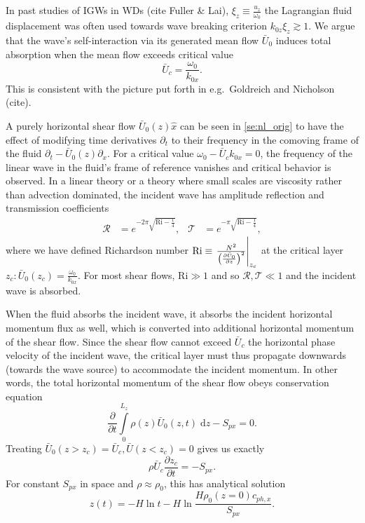 \documentclass[twocolumn,
        nofootinbib, %
        usenames, %
        aps,
        prd,
        dvipsnames %
    ]{revtex4-1}%
\newcommand*{\pd}[2]{\frac{\partial#1}{\partial#2}}
\newcommand*{\at}[1]{\left.#1\right|}
\DeclarePairedDelimiter\p{\lparen}{\rparen}
\begin{document}
In past studies of IGWs in WDs (cite Fuller \& Lai), $\xi_z \equiv
\frac{u_z}{\omega_0}$ the Lagrangian fluid displacement was often used towards
wave breaking criterion $k_{0z}\xi_z \gtrsim 1$. We argue that the wave's
self-interaction via its generated mean flow $\bar{U}_0$ induces total
absorption when the mean flow exceeds critical value
\begin{equation}
    \bar{U}_c = \frac{\omega_0}{k_{0x}}.
\end{equation}
This is consistent with the picture put forth in e.g.\ Goldreich and Nicholson
(cite).

A purely horizontal shear flow $\bar{U}_0(z) \hat{x}$ can be seen in
\autoref{se:nl_orig} to have the effect of modifying time derivatives
$\partial_t$ to their frequency in the comoving frame of the fluid $\partial_t -
\bar{U}_0(z)\partial_x$. For a critical value $\omega_0 - \bar{U}_c k_{0x} = 0$,
the frequency of the linear wave in the fluid's frame of reference vanishes and
critical behavior is observed. In a linear theory or a theory where small scales
are viscosity rather than advection dominated, the incident wave has amplitude
reflection and transmission coefficients
\begin{align}
    \mathcal{R} &= e^{-2\pi \sqrt{\mathrm{Ri} - \frac{1}{4}}}, &
    \mathcal{T} &= e^{-\pi \sqrt{\mathrm{Ri} - \frac{1}{4}}},
    \label{eq:crit_coeffs}
\end{align}
where we have defined Richardson number $\mathrm{Ri} \equiv
\at{\frac{N^2}{\p*{\pd{\bar{U}_0}{z}}^2}}_{z_c}$ at the critical layer $z_c:
\bar{U}_0(z_c) = \frac{\omega_0}{k_{0x}}$. For most shear flows, $\mathrm{Ri}
\gg 1$ and so $\mathcal{R}, \mathcal{T} \ll 1$ and the incident wave is
absorbed.

When the fluid absorbs the incident wave, it absorbs the incident horizontal
momentum flux as well, which is converted into additional horizontal momentum of
the shear flow. Since the shear flow cannot exceed $\bar{U}_c$ the horizontal
phase velocity of the incident wave, the critical layer must thus propagate
downwards (towards the wave source) to accommodate the incident momentum. In
other words, the total horizontal momentum of the shear flow obeys conservation
equation
\begin{equation}
    \pd{}{t}\int\limits_0^{L_z} \rho(z) \bar{U}_0(z, t)\;\mathrm{d}z
        - S_{px} = 0.
\end{equation}
Treating $\bar{U}_0(z > z_c) = \bar{U}_c, \bar{U}(z < z_c) = 0$ gives us exactly
\begin{equation}
    \rho \bar{U}_c\pd{z_c}{t} = -S_{px}.\label{eq:zc_anal}
\end{equation}
For constant $S_{px}$ in space and $\rho \approx \rho_0$, this has analytical
solution
\begin{equation}
    z(t) = -H\ln t - H\ln \frac{H\rho_0(z = 0)c_{ph, x}}{S_{px}}.
\end{equation}
\end{document}
